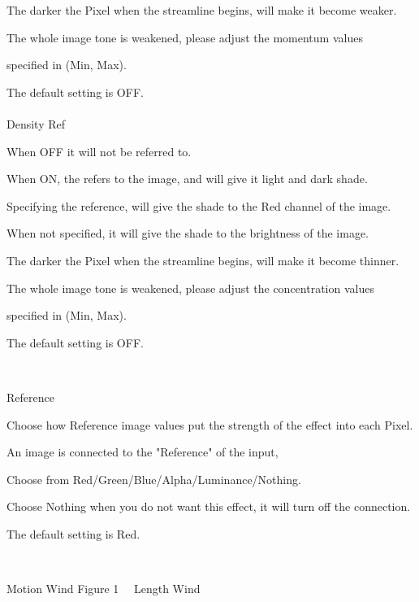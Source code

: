 \documentclass[a4paper,12pt]{article}
\begin{document}
The darker the Pixel when the streamline begins, will make it become weaker.\par
The whole image tone is weakened, please adjust the momentum values\par
specified in (Min, Max).\par
The default setting is OFF.\\
\\
Density Ref\par
When OFF it will not be referred to.\par
When ON, the refers to the image, and will give it light and dark shade.\par
Specifying the reference, will give the shade to the Red channel of the image.\par
When not specified, it will give the shade to the brightness of the image.\par
The darker the Pixel when the streamline begins, will make it become thinner.\par
The whole image tone is weakened, please adjust the concentration values\par
specified in (Min, Max).\par
The default setting is OFF.

\newpage

\thispagestyle{empty}

\ \vspace{1.3em}
\par
\noindent Reference\par
Choose how Reference image values put the strength of the effect into each Pixel.\par
An image is connected to the "Reference" of the input,\par
Choose from Red/Green/Blue/Alpha/Luminance/Nothing.\par
Choose Nothing when you do not want this effect, it will turn off the connection.\par
The default setting is Red.

\newpage

\thispagestyle{empty}

\ \vspace{-0.2em}
\par
\noindent Motion Wind Figure 1 \ \ Length Wind
\end{document}
